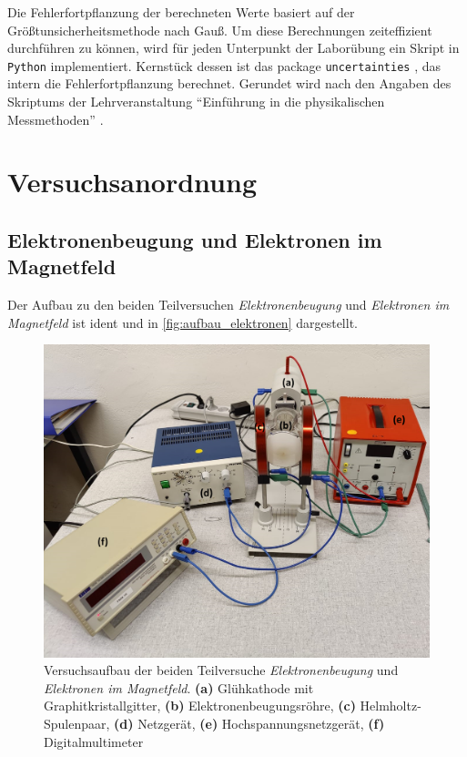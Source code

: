 \documentclass[ngerman]{scrartcl}
\begin{document}
Die Fehlerfortpflanzung der berechneten Werte basiert auf der Größtunsicherheitsmethode nach Gauß. Um diese Berechnungen zeiteffizient durchführen zu können, wird für jeden Unterpunkt der Laborübung ein Skript in \verb!Python! implementiert. Kernstück dessen ist das package \verb!uncertainties! \cite{ref:uncertainties}, das intern die Fehlerfortpflanzung berechnet. Gerundet wird nach den Angaben des Skriptums der Lehrveranstaltung \enquote{Einführung in die physikalischen Messmethoden} \cite{ref:messmethoden}.



\section{Versuchsanordnung}
\label{sec:versuchsanordnung}

\subsection{Elektronenbeugung und Elektronen im Magnetfeld}
\label{subsec:anordnung_elektronen}

Der Aufbau zu den beiden Teilversuchen \textit{Elektronenbeugung} und \textit{Elektronen im Magnetfeld} ist ident und in \autoref{fig:aufbau_elektronen} dargestellt.
%
\begin{figure}[H]
    \centering
    \begin{samepage}
        \includegraphics[width=0.8\linewidth]{fig/Beugung_Aufbau_beschriftet.png}
        \caption[Aufbau Elektronenbeugung und Elektronen im Magnetfeld]{Versuchsaufbau der beiden Teilversuche \textit{Elektronenbeugung} und \textit{Elektronen im Magnetfeld}. \textbf{(a)} Glühkathode mit Graphitkristallgitter, \textbf{(b)} Elektronenbeugungsröhre, \textbf{(c)} Helmholtz-Spulenpaar, \textbf{(d)} Netzgerät, \textbf{(e)} Hochspannungsnetzgerät, \textbf{(f)} Digitalmultimeter}
        \label{fig:aufbau_elektronen}
    \end{samepage}
\end{figure}
\end{document}
